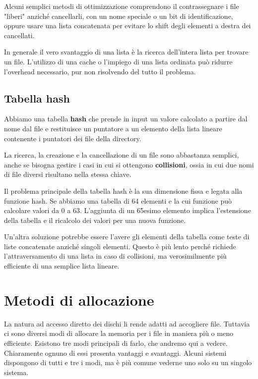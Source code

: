         Alcuni semplici metodi di ottimizzazione comprendono il contrassegnare i file "liberi" anziché cancellarli, con un nome speciale o un bit di identificazione, oppure usare una lista concatenata per evitare lo shift degli elementi a destra dei cancellati.
        
        In generale il vero svantaggio di una lista è la ricerca dell'intera lista per trovare un file. L'utilizzo di una cache o l'impiego di una lista ordinata può ridurre l'overhead necessario, pur non risolvendo del tutto il problema.
        
    \subsection{Tabella hash}
        Abbiamo una tabella \textbf{hash} che prende in input un valore calcolato a partire dal nome dal file e restituisce un puntatore a un elemento della lista lineare contenente i puntatori dei file della directory.
        
        La ricerca, la creazione e la cancellazione di un file sono abbastanza semplici, anche se bisogna gestire i casi in cui si ottengono \textbf{collisioni}, ossia in cui due nomi di file diversi risultano nella stessa chiave.
        
        Il problema principale della tabella hash è la sua dimensione fissa e legata alla funzione hash. Se abbiamo una tabella di 64 elementi e la cui funzione può calcolare valori da 0 a 63. L'aggiunta di un 65esimo elemento implica l'estensione della tabella e il ricalcolo dei valori per una nuova funzione.
        
        Un'altra soluzione potrebbe essere l'avere gli elementi della tabella come teste di liste concatenate anziché singoli elementi. Questo è più lento perché richiede l'attraversamento di una lista in caso di collisioni, ma verosimilmente più efficiente di una semplice lista lineare.
        
\newpage
\section{Metodi di allocazione}
    La natura ad accesso diretto dei dischi li rende adatti ad accogliere file. Tuttavia ci sono diversi modi di allocare la memoria per i file in maniera più o meno efficiente. Esistono tre modi principali di farlo, che andremo qui a vedere. Chiaramente ognuno di essi presenta vantaggi e svantaggi. Alcuni sistemi dispongono di tutti e tre i modi, ma è più comune vederne uno solo su un singolo sistema.
    
